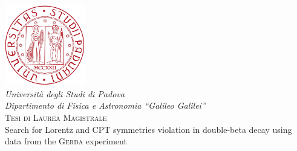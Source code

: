 \documentclass[11pt, a4paper]{book}
\newcommand{\aof}{\mathring{a}_\text{of}^{(3)}}
\begin{document}
\begin{titlepage}
	\thispagestyle{empty}
	\begin{center}
	\includegraphics[width=3.5cm]{img/logo.pdf} \\
	\vspace{1cm}
	\textsl{Universit\`a degli Studi di Padova} \\
	\textsl{Dipartimento di Fisica e Astronomia ``Galileo Galilei''} \\
	\vspace{11pt}
	\textsc{Tesi di Laurea Magistrale} \\
	\vspace{3cm}
	\LARGE{Search for Lorentz and CPT symmetries violation in double-beta decay using data from the \textsc{Gerda} experiment}
	\end{center}

\end{titlepage}
\end{document}
